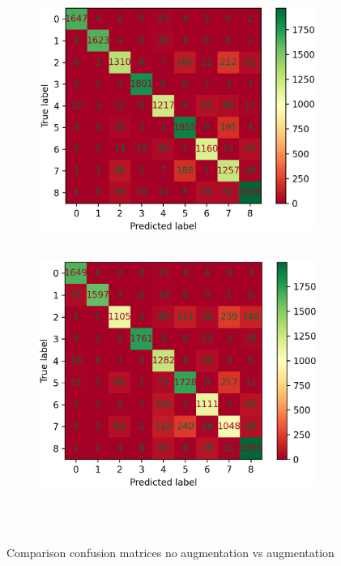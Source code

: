 \begin{figure}[ht]
	\centering
	\begin{subfigure}{0.49\columnwidth}
		\includegraphics[width=\columnwidth]{./figures/Alex_420_with_balancing_conf_matrix_cropped.png}
		~\label{fig:noaugmentation}
	\end{subfigure} 
	\begin{subfigure}{0.49\columnwidth}
		\includegraphics[width=\columnwidth]{./figures/Alex_420_augment_conf_matrix_cropped.png}
		~\label{fig:augmentation}
	\end{subfigure}
	\caption{Comparison confusion matrices no augmentation vs augmentation}~\label{fig:augmenetationcombined}
\end{figure}
